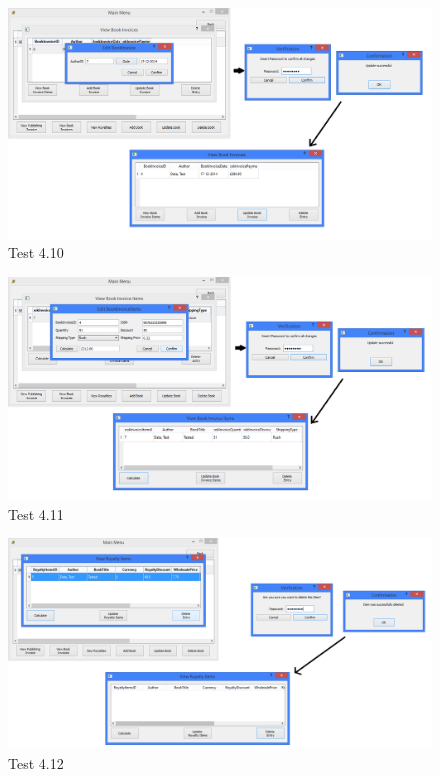 \begin{landscape}
\begin{figure}[H]
    \includegraphics[width=\textwidth]{./Testing/Evidence/Series4/UpdateBookInvoiceTest.png}
    \caption{Test 4.10}  \label{fig:UpdateBookInvoiceTest}
\end{figure}

\begin{figure}[H]
    \includegraphics[width=\textwidth]{./Testing/Evidence/Series4/UpdateBookInvoiceItemsTest.png}
    \caption{Test 4.11}  \label{fig:UpdateBookInvoiceItemsTest}
\end{figure}

\begin{figure}[H]
    \includegraphics[width=\textwidth]{./Testing/Evidence/Series4/DeleteRoyaltyItemsDataTest.png}
    \caption{Test 4.12}  \label{fig:DeleteRoyaltyItemsDataTest}
\end{figure}


\end{landscape}
